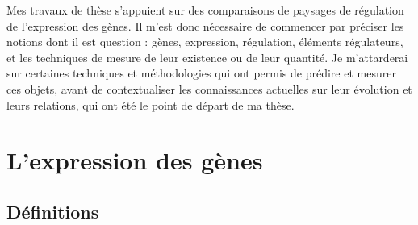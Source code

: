 Mes travaux de thèse s'appuient sur des comparaisons de paysages de régulation de l'expression des gènes. Il m’est donc nécessaire de commencer par préciser les notions dont il est question : gènes, expression, régulation, éléments régulateurs, et les techniques de mesure de leur existence ou de leur quantité. Je m’attarderai sur certaines techniques et méthodologies qui ont permis de prédire et mesurer ces objets, avant de contextualiser les connaissances actuelles sur leur évolution et leurs relations, qui ont été le point de départ de ma thèse.

\chapter{L’expression des gènes}
{\hypersetup{linkcolor=GREYDARK}\minitoc}
\label{chap:expression-des-gènes}

\section{Définitions}
\label{sec:definition-des-gènes}

